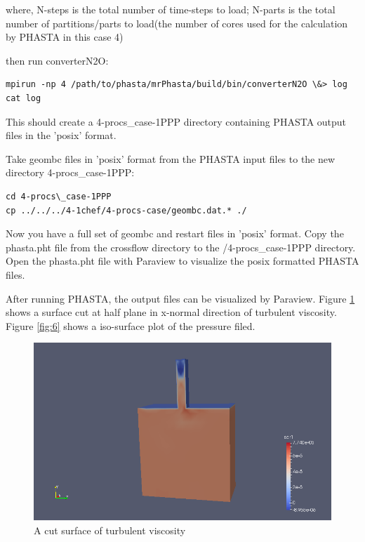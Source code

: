 \documentclass{article}
\begin{document}
where, N-steps is the total number of time-steps to load; N-parts is the total number of partitions/parts to load(the number of cores used for the calculation by PHASTA in this case 4)

then run converterN2O:
\begin{lstlisting}
mpirun -np 4 /path/to/phasta/mrPhasta/build/bin/converterN2O \&> log
cat log
\end{lstlisting}

This should create a 4-procs\_case-1PPP directory containing PHASTA output files in the 'posix' format.

Take geombc files in 'posix' format from the PHASTA input files to the new directory 4-procs\_case-1PPP:

\begin{lstlisting}
cd 4-procs\_case-1PPP
cp ../../../4-1chef/4-procs-case/geombc.dat.* ./
\end{lstlisting}

Now you have a full set of geombc and restart files in 'posix' format. Copy the phasta.pht file from the crossflow directory to the /4-procs\_case-1PPP directory. Open the phasta.pht file with Paraview to visualize the posix formatted PHASTA files.

After running PHASTA, the output files can be visualized by Paraview. Figure \ref{fig:5} shows a surface cut at half plane in x-normal direction of turbulent viscosity. Figure \ref{fig:6} shows a iso-surface plot of the pressure filed.

\begin{figure}[h!]
\centering
\includegraphics[width=1\textwidth]{res1}
\caption{A cut surface of turbulent viscosity}
\label{fig:5}
\end{figure}
\end{document}
